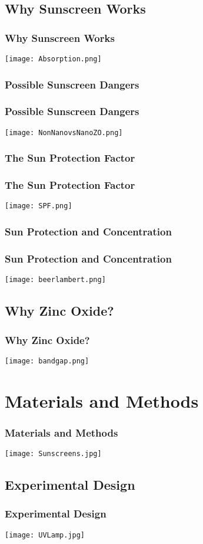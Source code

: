 \documentclass[10pt,aspectratio=169]{beamer} %
\begin{document}
\subsection{Why Sunscreen Works}
\begin{frame}\centering
  \frametitle{Why Sunscreen Works}
  \texttt{[image: Absorption.png]}
\end{frame}
\subsubsection{Possible Sunscreen Dangers}
\begin{frame}\centering
  \frametitle{Possible Sunscreen Dangers}
  \texttt{[image: NonNanovsNanoZO.png]}
\end{frame}
\subsubsection{The Sun Protection Factor}
\begin{frame}\centering
  \frametitle{The Sun Protection Factor}
  \texttt{[image: SPF.png]}
\end{frame}
\subsubsection{Sun Protection and Concentration}
\begin{frame}\centering
  \frametitle{Sun Protection and Concentration}
  \texttt{[image: beerlambert.png]}
\end{frame}
\subsection{Why Zinc Oxide?}
\begin{frame}\centering
  \frametitle{Why Zinc Oxide?}
  \texttt{[image: bandgap.png]}
\end{frame}

\section{Materials and Methods}
\begin{frame}\centering
  \frametitle{Materials and Methods}
  \texttt{[image: Sunscreens.jpg]}
\end{frame}
\subsection{Experimental Design}
\begin{frame}\centering
  \frametitle{Experimental Design}
  \texttt{[image: UVLamp.jpg]}
\end{frame}
\end{document}
